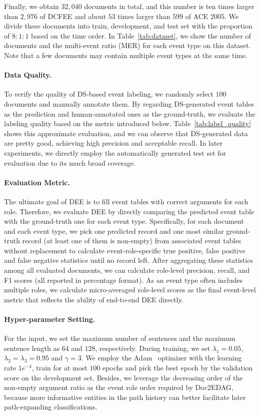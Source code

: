 \documentclass[11pt,a4paper]{article}
\begin{document}
Finally, we obtain $32,040$ documents in total,
and this number is ten times larger than $2,976$ of DCFEE and about $53$ times larger than $599$ of ACE 2005.
We divide these documents into train, development, and test set with the proportion of $8:1:1$ based on the time order.
In Table~\ref{tab:dataset}, we show the number of documents and the multi-event ratio (MER) for each event type on this dataset.
Note that a few documents may contain multiple event types at the same time.



\paragraph{Data Quality.}
To verify the quality of DS-based event labeling,
we randomly select $100$ documents and manually annotate them.
By regarding DS-generated event tables as the prediction and human-annotated ones as the ground-truth,
we evaluate the labeling quality based on the metric introduced below.
Table~\ref{tab:label_quality} shows this approximate evaluation,
and we can observe that DS-generated data are pretty good, achieving high precision and acceptable recall.
In later experiments, we directly employ the automatically generated test set for evaluation due to its much broad coverage.


\paragraph{Evaluation Metric.}
The ultimate goal of DEE is to fill event tables with correct arguments for each role.
Therefore, we evaluate DEE by directly comparing the predicted event table with the ground-truth one for each event type.
Specifically, for each document and each event type, we pick one predicted record and one most similar ground-truth record (at least one of them is non-empty) from associated event tables without replacement to calculate event-role-specific true positive, false positive and false negative statistics until no record left.
After aggregating these statistics among all evaluated documents, we can calculate role-level precision, recall, and F1 scores (all reported in percentage format).
As an event type often includes multiple roles, we calculate micro-averaged role-level scores as the final event-level metric that reflects the ability of end-to-end DEE directly.

\paragraph{Hyper-parameter Setting.}
For the input, we set the maximum number of sentences and the maximum sentence length as $64$ and $128$, respectively.
During training, we set $\lambda_1=0.05$, $\lambda_2=\lambda_3=0.95$ and $\gamma=3$.
We employ the Adam~\cite{kingma2014adam} optimizer with the learning rate $1e^{-4}$,
train for at most $100$ epochs and pick the best epoch by the validation score on the development set.
Besides, we leverage the decreasing order of the non-empty argument ratio as the event role order required by Doc2EDAG, because more informative entities in the path history can better facilitate later path-expanding classifications.
\end{document}

